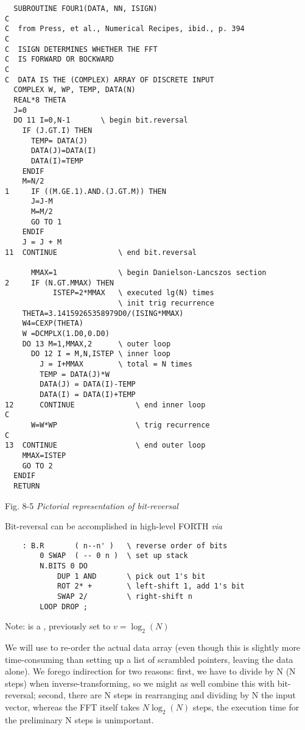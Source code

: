 \begin{verbatim}
  SUBROUTINE FOUR1(DATA, NN, ISIGN)
C
C  from Press, et al., Numerical Recipes, ibid., p. 394
C   
C  ISIGN DETERMINES WHETHER THE FFT
C  IS FORWARD OR BOCKWARD
C
C  DATA IS THE (COMPLEX) ARRAY OF DISCRETE INPUT 
  COMPLEX W, WP, TEMP, DATA(N)
  REAL*8 THETA
  J=0
  DO 11 I=0,N-1       \ begin bit.reversal
    IF (J.GT.I) THEN
      TEMP= DATA(J)
      DATA(J)=DATA(I)
      DATA(I)=TEMP
    ENDIF
    M=N/2
1     IF ((M.GE.1).AND.(J.GT.M)) THEN
      J=J-M
      M=M/2
      GO TO 1
    ENDIF
    J = J + M
11  CONTINUE              \ end bit.reversal
      
      MMAX=1              \ begin Danielson-Lancszos section
2     IF (N.GT.MMAX) THEN
           ISTEP=2*MMAX   \ executed lg(N) times
                          \ init trig recurrence
    THETA=3.14159265358979D0/(ISING*MMAX)
    W4=CEXP(THETA)
    W =DCMPLX(1.D0,0.D0)
    DO 13 M=1,MMAX,2      \ outer loop
      DO 12 I = M,N,ISTEP \ inner loop
        J = I+MMAX        \ total = N times
        TEMP = DATA(J)*W
        DATA(J) = DATA(I)-TEMP
        DATA(I) = DATA(I)+TEMP
12      CONTINUE              \ end inner loop
C
      W=W*WP                  \ trig recurrence
C
13  CONTINUE                  \ end outer loop
    MMAX=ISTEP
    GO TO 2
  ENDIF
  RETURN
\end{verbatim}

Fig. 8-5 \textit{Pictorial representation of bit-reversal}

Bit-reversal can be accomplished in high-level FORTH \textit{via}

\begin{lstlisting}
    : B.R       ( n--n' )   \ reverse order of bits
        0 SWAP  ( -- 0 n )  \ set up stack
        N.BITS 0 DO
            DUP 1 AND       \ pick out 1's bit
            ROT 2* +        \ left-shift 1, add 1's bit
            SWAP 2/         \ right-shift n
        LOOP DROP ;
\end{lstlisting}

\leftbar[1\linewidth]
Note:  is a , previously set to $v = \log_{2}(N)$
\endleftbar

We will use  to re-order the actual data array (even though this is slightly more time-consuming than setting up a list of scrambled pointers, leaving the data alone). We forego indirection for two reasons: first, we have to divide by N (N steps) when inverse-transforming, so we might as well combine this with bit-reversal; second, there are N steps in rearranging and dividing by N the input vector, whereas the FFT itself takes $N\log_{2}(N)$ steps, \ie the execution time for the preliminary N steps is unimportant.


